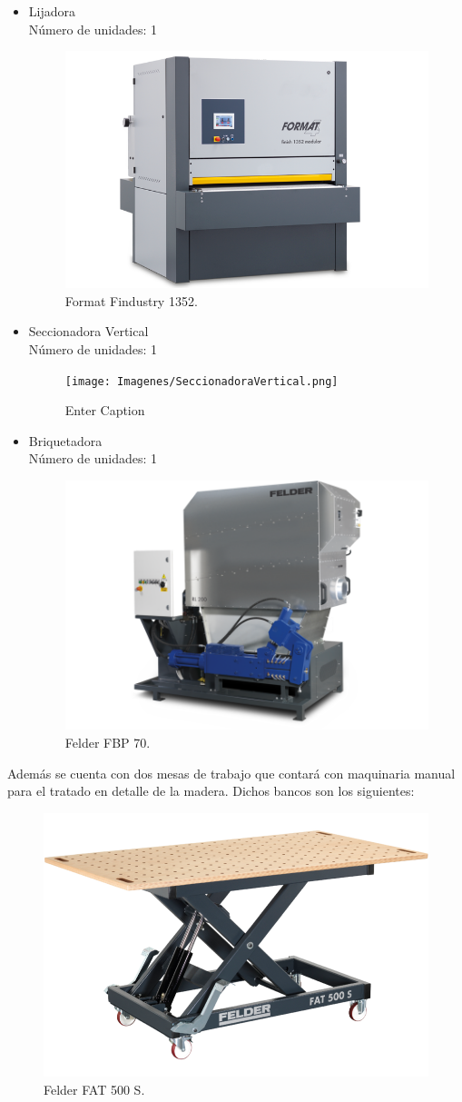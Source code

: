 \documentclass[../main.tex]{subfiles}
\begin{document}
\begin{itemize}
    \item Lijadora \\
    Número de unidades: 1
    \begin{figure}[H]
        \centering
        \includegraphics[width=0.5\linewidth]{Imagenes/Lijadora.png}
        \caption{Format Findustry 1352.}
    \end{figure}

    \item Seccionadora Vertical \\
    Número de unidades: 1
    \begin{figure}[H]
        \centering
        \texttt{[image: Imagenes/SeccionadoraVertical.png]}
        \caption{Enter Caption}
        \label{fig:enter-label}
    \end{figure}

    \item Briquetadora \\
    Número de unidades: 1
    \begin{figure}[H]
        \centering
        \includegraphics[width=0.5\linewidth]{Imagenes/Briquetadora.png}
        \caption{Felder FBP 70.}
    \end{figure}
    
\end{itemize}

Además se cuenta con dos mesas de trabajo que contará con maquinaria manual para el tratado en detalle de la madera. Dichos bancos son los siguientes:
\begin{figure}[H]
    \centering
    \includegraphics[width=0.5\linewidth]{Imagenes/MesaTrabajo.png}
    \caption{Felder FAT 500 S.}
\end{figure}
\end{document}

